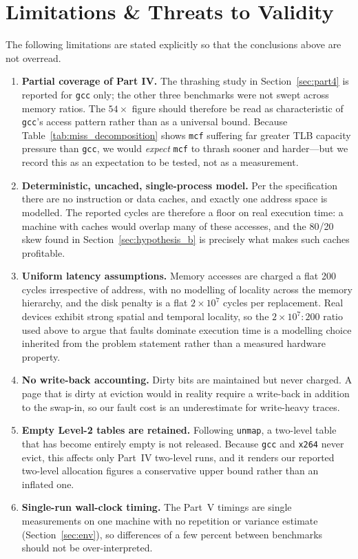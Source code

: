 \documentclass[11pt,a4paper]{article}
\begin{document}
\section{Limitations \& Threats to Validity}
\label{sec:limitations}
The following limitations are stated explicitly so that the conclusions above are not overread.

\begin{enumerate}
    \item \textbf{Partial coverage of Part IV.} The thrashing study in Section~\ref{sec:part4} is reported for \texttt{gcc} only; the other three benchmarks were not swept across memory ratios. The $54\times$ figure should therefore be read as characteristic of \texttt{gcc}'s access pattern rather than as a universal bound. Because Table~\ref{tab:miss_decomposition} shows \texttt{mcf} suffering far greater TLB capacity pressure than \texttt{gcc}, we would \emph{expect} \texttt{mcf} to thrash sooner and harder---but we record this as an expectation to be tested, not as a measurement.
    \item \textbf{Deterministic, uncached, single-process model.} Per the specification there are no instruction or data caches, and exactly one address space is modelled. The reported cycles are therefore a floor on real execution time: a machine with caches would overlap many of these accesses, and the 80/20 skew found in Section~\ref{sec:hypothesis_b} is precisely what makes such caches profitable.
    \item \textbf{Uniform latency assumptions.} Memory accesses are charged a flat 200 cycles irrespective of address, with no modelling of locality across the memory hierarchy, and the disk penalty is a flat $2\times10^{7}$ cycles per replacement. Real devices exhibit strong spatial and temporal locality, so the $2\times10^{7}:200$ ratio used above to argue that faults dominate execution time is a modelling choice inherited from the problem statement rather than a measured hardware property.
    \item \textbf{No write-back accounting.} Dirty bits are maintained but never charged. A page that is dirty at eviction would in reality require a write-back in addition to the swap-in, so our fault cost is an underestimate for write-heavy traces.
    \item \textbf{Empty Level-2 tables are retained.} Following \texttt{unmap}, a two-level table that has become entirely empty is not released. Because \texttt{gcc} and \texttt{x264} never evict, this affects only Part~IV two-level runs, and it renders our reported two-level allocation figures a conservative upper bound rather than an inflated one.
    \item \textbf{Single-run wall-clock timing.} The Part~V timings are single measurements on one machine with no repetition or variance estimate (Section~\ref{sec:env}), so differences of a few percent between benchmarks should not be over-interpreted.
\end{enumerate}
\end{document}
